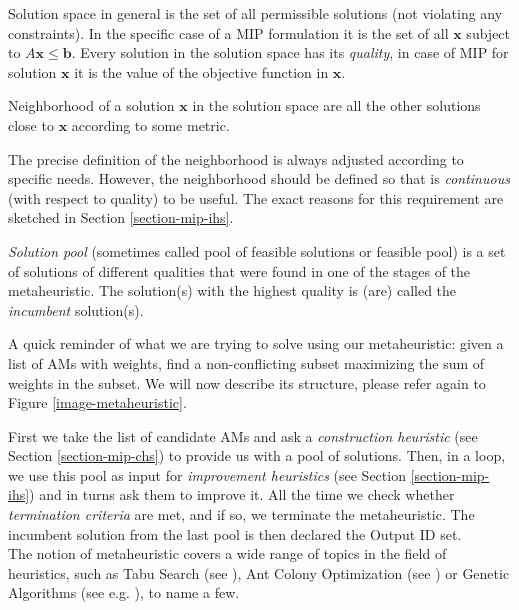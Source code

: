 \begin{define}
	Solution space in general is the set of all permissible solutions (not violating any constraints). In the specific case of a MIP formulation it is the set of all $\mathbf{x}$ subject to $A\mathbf{x} \leqslant \mathbf{b}$. Every solution in the solution space has its \textit{quality}, in case of MIP for solution $\mathbf{x}$ it is the value of the objective function in $\mathbf{x}$.
\end{define}

\begin{define}
	Neighborhood of a solution $\mathbf{x}$ in the solution space are all the other solutions close to $\mathbf{x}$ according to some metric.
\end{define}

The precise definition of the neighborhood is always adjusted according to specific needs. However, the neighborhood should be defined so that is \textit{continuous} (with respect to quality) to be useful. The exact reasons for this requirement are sketched in Section \ref{section-mip-ihs}.

\begin{define}
	\textit{Solution pool} (sometimes called pool of feasible solutions or feasible pool) is a set of solutions of different qualities that were found in one of the stages of the metaheuristic. The solution(s) with the highest quality is (are) called the \textit{incumbent} solution(s).
\end{define}

A quick reminder of what we are trying to solve using our metaheuristic: given a list of AMs with weights, find a non-conflicting subset maximizing the sum of weights in the subset. We will now describe its structure, please refer again to Figure \ref{image-metaheuristic}.

First we take the list of candidate AMs and ask a \textit{construction heuristic} (see Section \ref{section-mip-chs}) to provide us with a pool of solutions. Then, in a loop, we use this pool as input for \textit{improvement heuristics} (see Section \ref{section-mip-ihs}) and in turns ask them to improve it. All the time we check whether \textit{termination criteria} are met, and if so, we terminate the metaheuristic. The incumbent solution from the last pool is then declared the Output ID set.\\

The notion of metaheuristic covers a wide range of topics in the field of heuristics, such as Tabu Search (see \cite{Glover:1997:TS:549765}), Ant Colony Optimization (see \cite{dorigo2004ant}) or Genetic Algorithms (see e.g. \cite{goldberg1989genetic}), to name a few.\\

